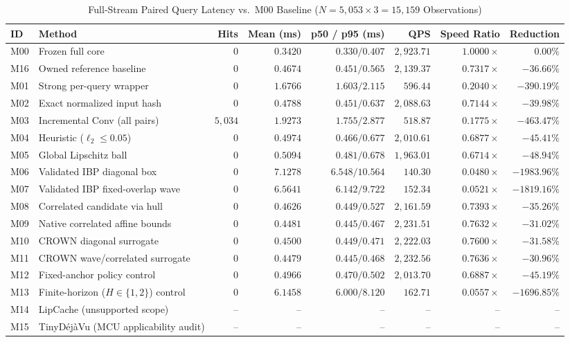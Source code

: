 \documentclass[11pt,oneside,a4paper]{report}
\newcommand{\code}[1]{{\small\upshape\ttfamily #1}}
\theoremstyle{remark}
\begin{document}
\begin{table}[htbp]
\centering\small
\caption{Full-Stream Paired Query Latency vs.\ \code{M00} Baseline ($N = 5,053 \times 3 = 15,159$ Observations)}
\label{tab:paired_main}
\begin{tabularx}{\textwidth}{@{}lYrrrrrr@{}}
\toprule
\textbf{ID} & \textbf{Method} & \textbf{Hits} & \textbf{Mean (ms)} & \textbf{p50 / p95 (ms)} & \textbf{QPS} & \textbf{Speed Ratio} & \textbf{Reduction} \\
\midrule
\code{M00} & Frozen full core & $0$ & $0.3420$ & $0.330 / 0.407$ & $2,923.71$ & $1.0000\times$ & $0.00\%$ \\
\code{M16} & Owned reference baseline & $0$ & $0.4674$ & $0.451 / 0.565$ & $2,139.37$ & $0.7317\times$ & $-36.66\%$ \\
\code{M01} & Strong per-query wrapper & $0$ & $1.6766$ & $1.603 / 2.115$ & $596.44$ & $0.2040\times$ & $-390.19\%$ \\
\code{M02} & Exact normalized input hash & $0$ & $0.4788$ & $0.451 / 0.637$ & $2,088.63$ & $0.7144\times$ & $-39.98\%$ \\
\code{M03} & Incremental Conv (all pairs) & $5,034$ & $1.9273$ & $1.755 / 2.877$ & $518.87$ & $0.1775\times$ & $-463.47\%$ \\
\code{M04} & Heuristic ($\ell_2 \le 0.05$) & $0$ & $0.4974$ & $0.466 / 0.677$ & $2,010.61$ & $0.6877\times$ & $-45.41\%$ \\
\code{M05} & Global Lipschitz ball & $0$ & $0.5094$ & $0.481 / 0.678$ & $1,963.01$ & $0.6714\times$ & $-48.94\%$ \\
\code{M06} & Validated IBP diagonal box & $0$ & $7.1278$ & $6.548 / 10.564$ & $140.30$ & $0.0480\times$ & $-1983.96\%$ \\
\code{M07} & Validated IBP fixed-overlap wave & $0$ & $6.5641$ & $6.142 / 9.722$ & $152.34$ & $0.0521\times$ & $-1819.16\%$ \\
\code{M08} & Correlated candidate via hull & $0$ & $0.4626$ & $0.449 / 0.527$ & $2,161.59$ & $0.7393\times$ & $-35.26\%$ \\
\code{M09} & Native correlated affine bounds & $0$ & $0.4481$ & $0.445 / 0.467$ & $2,231.51$ & $0.7632\times$ & $-31.02\%$ \\
\code{M10} & CROWN diagonal surrogate & $0$ & $0.4500$ & $0.449 / 0.471$ & $2,222.03$ & $0.7600\times$ & $-31.58\%$ \\
\code{M11} & CROWN wave/correlated surrogate & $0$ & $0.4479$ & $0.445 / 0.468$ & $2,232.56$ & $0.7636\times$ & $-30.96\%$ \\
\code{M12} & Fixed-anchor policy control & $0$ & $0.4966$ & $0.470 / 0.502$ & $2,013.70$ & $0.6887\times$ & $-45.19\%$ \\
\code{M13} & Finite-horizon ($H\in\{1,2\}$) control & $0$ & $6.1458$ & $6.000 / 8.120$ & $162.71$ & $0.0557\times$ & $-1696.85\%$ \\
\code{M14} & LipCache (unsupported scope) & -- & -- & -- & -- & -- & -- \\
\code{M15} & TinyD\'ej\`aVu (MCU applicability audit) & -- & -- & -- & -- & -- & -- \\
\bottomrule
\end{tabularx}
\end{table}
\end{document}

